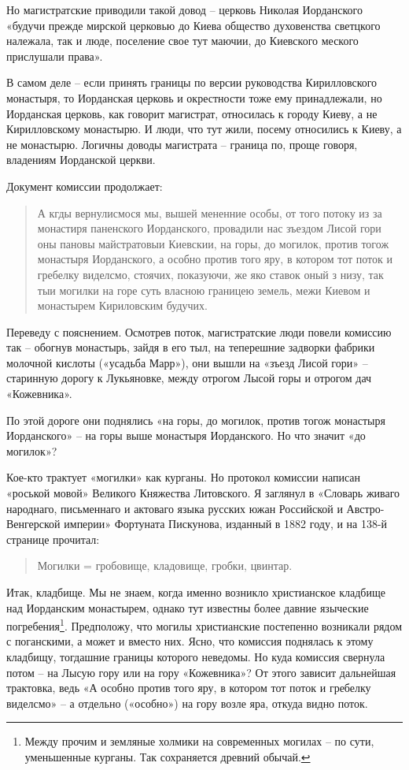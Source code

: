 Но магистратские приводили такой довод – церковь Николая Иорданского «будучи прежде мирской церковью до Киева общество духовенства светцкого належала, так и люде, поселение свое тут маючии, до Киевского меского прислушали права».

В самом деле – если принять границы по версии руководства Кирилловского монастыря, то Иорданская церковь и окрестности тоже ему принадлежали, но Иорданская церковь, как говорит магистрат, относилась к городу Киеву, а не Кирилловскому монастырю. И люди, что тут жили, посему относились к Киеву, а не монастырю. Логичны доводы магистрата – граница по, проще говоря, владениям Иорданской церкви.
  
Документ комиссии продолжает:

\begin{quotation}
А кгды вернулисмося мы, вышей мененние особы, от того потоку из за монастиря паненского Иорданского, провадили нас зъездом Лисой гори оны пановы майстратовыи Киевскии, на горы, до могилок, против тогож монастыря Иорданского, а особно против того яру, в котором тот поток и гребелку виделсмо, стоячих, показуючи, же яко ставок оный з низу, так тыи могилки на горе суть власною границею земель, межи Киевом и монастырем Кириловским будучих.
\end{quotation}

Переведу с пояснением. Осмотрев поток, магистратские люди повели комиссию так – обогнув монастырь, зайдя в его тыл, на теперешние задворки фабрики молочной кислоты («усадьба Марр»), они вышли на «зъезд Лисой гори» – старинную дорогу к Лукьяновке, между отрогом Лысой горы и отрогом дач «Кожевника».

По этой дороге они поднялись «на горы, до могилок, против тогож монастыря Иорданского» – на горы выше монастыря Иорданского. Но что значит «до могилок»?

Кое-кто трактует «могилки» как курганы. Но протокол комиссии написан «роськой мовой» Великого Княжества Литовского. Я заглянул в «Словарь живаго народнаго, письменнаго и актоваго языка русских южан Российской и Австро-Венгерской империи» Фортуната Пискунова, изданный в 1882 году, и на 138-й странице прочитал:

\begin{quotation}
Могилки = гробовище, кладовище, гробки, цвинтар.
\end{quotation}

Итак, кладбище. Мы не знаем, когда именно возникло христианское кладбище над Иорданским монастырем, однако тут известны более давние языческие погребения\footnote{Между прочим и земляные холмики на современных могилах – по сути, уменьшенные курганы. Так сохраняется древний обычай.}. Предположу, что могилы христианские постепенно возникали рядом с поганскими, а может и вместо них. Ясно, что комиссия поднялась к этому кладбищу, тогдашние границы которого неведомы. Но куда комиссия свернула потом – на Лысую гору или на гору «Кожевника»? От этого зависит дальнейшая трактовка, ведь «А особно против того яру, в котором тот поток и гребелку виделсмо» – а отдельно («особно») на гору возле яра, откуда видно поток. 

